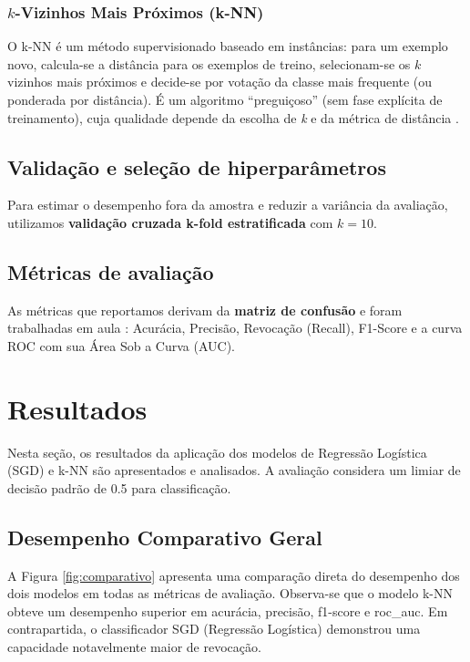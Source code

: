 \documentclass[12pt]{article}
\begin{document}
\subsubsection{\texorpdfstring{$k$-Vizinhos Mais Próximos (k-NN)}{k-Vizinhos Mais Próximos (k-NN)}}
O k-NN é um método supervisionado baseado em instâncias: para um exemplo novo, calcula-se a distância para os exemplos de treino,
selecionam-se os $k$ vizinhos mais próximos e decide-se por votação da classe mais frequente (ou ponderada por distância).
É um algoritmo ``preguiçoso'' (sem fase explícita de treinamento), cuja qualidade depende da escolha de \emph{k} e da métrica de distância
\cite{naozuka_knn_2025}.

\subsection{Validação e seleção de hiperparâmetros}
Para estimar o desempenho fora da amostra e reduzir a variância da avaliação, utilizamos \textbf{validação cruzada k-fold estratificada} com $k=10$.

\subsection{Métricas de avaliação}
As métricas que reportamos derivam da \textbf{matriz de confusão} e foram trabalhadas em aula \cite{naozuka_metricas_2025}: Acurácia, Precisão, Revocação (Recall), F1-Score e a curva ROC com sua Área Sob a Curva (AUC).

\section{Resultados}

Nesta seção, os resultados da aplicação dos modelos de Regressão Logística (SGD) e k-NN são apresentados e analisados. A avaliação considera um limiar de decisão padrão de 0.5 para classificação.

\subsection{Desempenho Comparativo Geral}

A Figura \ref{fig:comparativo} apresenta uma comparação direta do desempenho dos dois modelos em todas as métricas de avaliação. Observa-se que o modelo k-NN obteve um desempenho superior em acurácia, precisão, f1-score e roc\_auc. Em contrapartida, o classificador SGD (Regressão Logística) demonstrou uma capacidade notavelmente maior de revocação.
\end{document}

